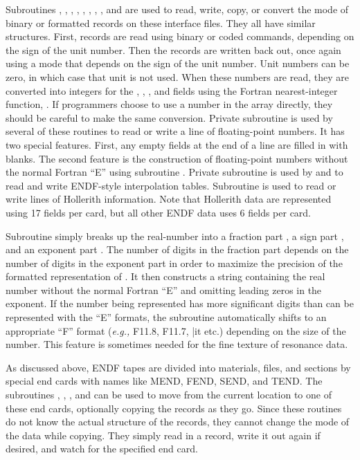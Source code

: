 Subroutines , , ,
, , , ,
, and  are used to read, write, copy,
or convert the mode of binary or formatted records on these
interface files.  They all have similar structures.  First,
records are read using binary or coded commands, depending on
the sign of the unit number.  Then the records are written back
out, once again using a mode that depends on the sign of the
unit number.  Unit numbers can be zero, in which case that unit
is not used.  When these numbers are read, they are converted
into integers for the , , , and
 fields using the Fortran nearest-integer function,
.  If programmers choose to use a number in the array
 directly, they should be careful to make the same
conversion.  Private subroutine  is used by several
of these routines to read or write a line of floating-point
numbers.  It has two special features.  First, any empty fields
at the end of a line are filled in with blanks.  The second
feature is the construction of floating-point numbers without
the normal Fortran ``E'' using subroutine .  Private
subroutine  is used by  and 
to read and write ENDF-style interpolation tables.  Subroutine
 is used to read or write lines of Hollerith information.
Note that Hollerith data are represented using 17 fields per card, but
all other ENDF data uses 6 fields per card.

Subroutine  simply breaks up the real-number 
into a fraction part , a sign part , and an exponent
part .  The number of digits in the fraction part depends on
the number of digits in the exponent part in order to maximize the
precision of the formatted representation of .  It then
constructs a string containing the real number without the normal
Fortran ``E'' and omitting leading zeros in the exponent.  If the
number being represented has more significant digits than can be
represented with the ``E'' formats, the subroutine automatically
shifts to an appropriate ``F'' format ({\it e.g.,} F11.8, F11.7,
{|it etc.}) depending on the size of the number.  This feature is
sometimes needed for the fine texture of resonance data.

As discussed above, ENDF tapes are divided into materials, files, and
sections by special end cards with names like MEND, FEND, SEND, and
TEND.  The subroutines , , ,
and  can be used to move from the current location to
one of these end cards, optionally copying the records as they go.
Since these routines do not know the actual structure of the records,
they cannot change the mode of the data while copying.  They simply
read in a record, write it out again if desired, and watch for the
specified end card.


